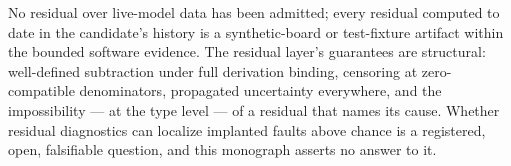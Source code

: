 \begin{boundary}\label{ch10:bound:residuals}
No residual over live-model data has been admitted; every residual
computed to date in the candidate's history is a synthetic-board or
test-fixture artifact within the bounded software evidence. The residual
layer's guarantees are structural: well-defined subtraction under full
derivation binding, censoring at zero-compatible denominators,
propagated uncertainty everywhere, and the impossibility --- at the type
level --- of a residual that names its cause. Whether residual
diagnostics can localize implanted faults above chance is a registered,
open, falsifiable question, and this monograph asserts no answer to it.
\end{boundary}
